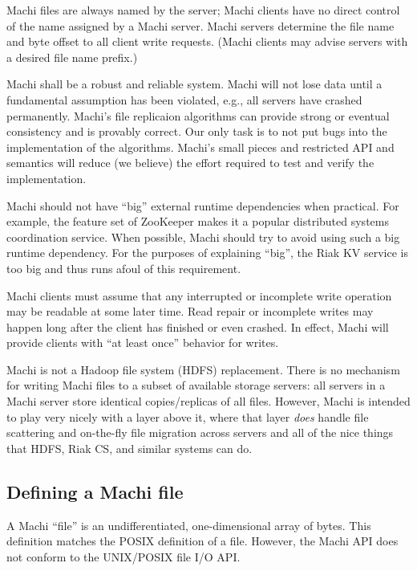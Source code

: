 \documentclass[preprint,10pt]{sigplanconf}
\begin{document}
Machi files are always named by the server; Machi clients have no
direct control of the name assigned by a Machi server.  Machi servers
determine the file name and byte offset to all client write requests.
(Machi clients may advise servers with a desired file name prefix.)

Machi shall be a
robust and reliable system. Machi will not lose data until a
fundamental assumption has been violated, e.g., all servers have
crashed permanently.  Machi's file replicaion algorithms can provide
strong or eventual consistency and is provably correct.  Our only
task is to not put bugs into the implementation of the algorithms.  Machi's
small pieces and restricted API and semantics will reduce
(we believe) the effort required to test
and verify the implementation.

Machi should not have ``big'' external runtime dependencies when
practical.  For example, the feature set of ZooKeeper makes it a
popular distributed systems coordination service.  When possible,
Machi should try to avoid using such a big runtime dependency.  For
the purposes of explaining ``big'', the Riak KV service is too big and
thus runs afoul of this requirement.

Machi clients must assume that any interrupted or incomplete write
operation may be readable at some later time.  Read repair or
incomplete writes may happen long after the client has finished or
even crashed.  In effect, Machi will provide clients with
``at least once'' behavior for writes.

Machi is not a Hadoop file system (HDFS) replacement.
There is no mechanism for writing Machi files to a subset of
      available storage servers: all servers in a Machi server store
      identical copies/replicas of all files.
However, Machi is intended to play very nicely with a layer above it,
      where that layer {\em does} handle file scattering and on-the-fly
      file migration across servers and all of the nice things that
      HDFS, Riak CS, and similar systems can do.

\subsection{Defining a Machi file}

A Machi ``file'' is an undifferentiated, one-dimensional array of
bytes.  This definition matches the POSIX definition of a file.
However, the Machi API does not conform to the UNIX/POSIX file
I/O API.
\end{document}
